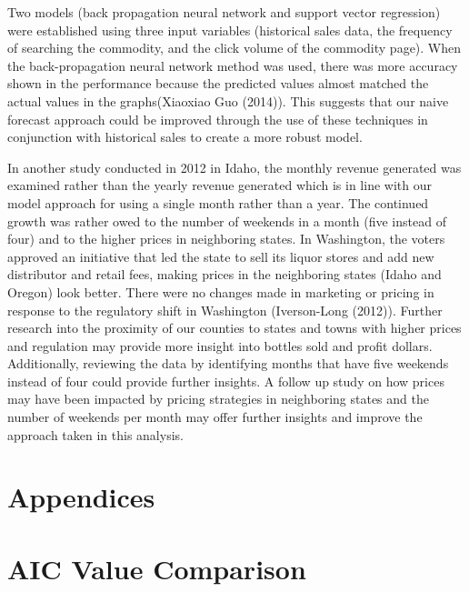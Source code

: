 \documentclass[]{elsarticle} %
\begin{document}
Two models (back propagation neural network and support vector
regression) were established using three input variables (historical
sales data, the frequency of searching the commodity, and the click
volume of the commodity page). When the back-propagation neural network
method was used, there was more accuracy shown in the performance
because the predicted values almost matched the actual values in the
graphs(Xiaoxiao Guo (2014)). This suggests that our naive forecast
approach could be improved through the use of these techniques in
conjunction with historical sales to create a more robust model.

In another study conducted in 2012 in Idaho, the monthly revenue
generated was examined rather than the yearly revenue generated which is
in line with our model approach for using a single month rather than a
year. The continued growth was rather owed to the number of weekends in
a month (five instead of four) and to the higher prices in neighboring
states. In Washington, the voters approved an initiative that led the
state to sell its liquor stores and add new distributor and retail fees,
making prices in the neighboring states (Idaho and Oregon) look better.
There were no changes made in marketing or pricing in response to the
regulatory shift in Washington (Iverson-Long (2012)). Further research
into the proximity of our counties to states and towns with higher
prices and regulation may provide more insight into bottles sold and
profit dollars. Additionally, reviewing the data by identifying months
that have five weekends instead of four could provide further insights.
A follow up study on how prices may have been impacted by pricing
strategies in neighboring states and the number of weekends per month
may offer further insights and improve the approach taken in this
analysis.

\newpage

\section{Appendices}\label{appendices}

\section{AIC Value Comparison}\label{aic-value-comparison}
\end{document}

